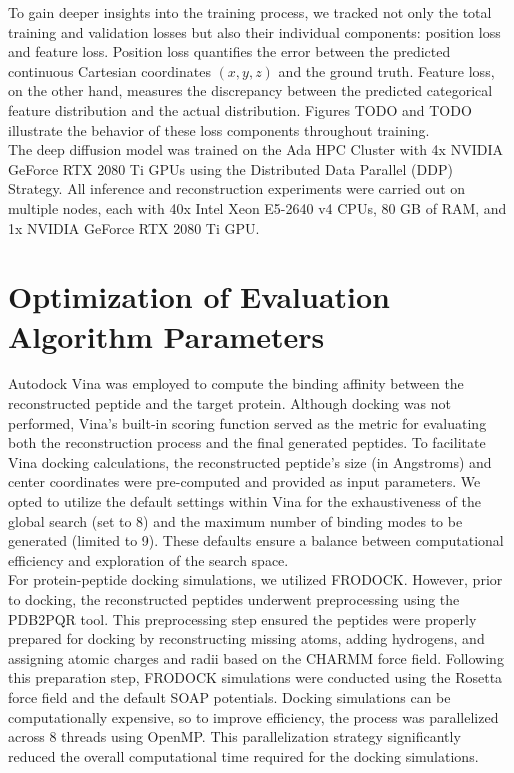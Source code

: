 To gain deeper insights into the training process, we tracked not only the total training and validation losses but also their individual components: position loss and feature loss. Position loss quantifies the error between the predicted continuous Cartesian coordinates $(x, y, z)$ and the ground truth. Feature loss, on the other hand, measures the discrepancy between the predicted categorical feature distribution and the actual distribution. Figures TODO and TODO illustrate the behavior of these loss components throughout training. \\

The deep diffusion model was trained on the Ada HPC Cluster with 4x NVIDIA GeForce RTX 2080 Ti GPUs using the Distributed Data Parallel (DDP) Strategy. All inference and reconstruction experiments were carried out on multiple nodes, each with 40x Intel Xeon E5-2640 v4 CPUs, 80 GB of RAM, and 1x NVIDIA GeForce RTX 2080 Ti GPU.

\section{Optimization of Evaluation Algorithm Parameters}
Autodock Vina was employed to compute the binding affinity between the reconstructed peptide and the target protein. Although docking was not performed, Vina's built-in scoring function served as the metric for evaluating both the reconstruction process and the final generated peptides. To facilitate Vina docking calculations, the reconstructed peptide's size (in Angstroms) and center coordinates were pre-computed and provided as input parameters. We opted to utilize the default settings within Vina for the exhaustiveness of the global search (set to 8) and the maximum number of binding modes to be generated (limited to 9). These defaults ensure a balance between computational efficiency and exploration of the search space. \\

For protein-peptide docking simulations, we utilized FRODOCK. However, prior to docking, the reconstructed peptides underwent preprocessing using the PDB2PQR tool. This preprocessing step ensured the peptides were properly prepared for docking by reconstructing missing atoms, adding hydrogens, and assigning atomic charges and radii based on the CHARMM force field. Following this preparation step, FRODOCK simulations were conducted using the Rosetta force field and the default SOAP potentials. Docking simulations can be computationally expensive, so to improve efficiency, the process was parallelized across 8 threads using OpenMP. This parallelization strategy significantly reduced the overall computational time required for the docking simulations.

